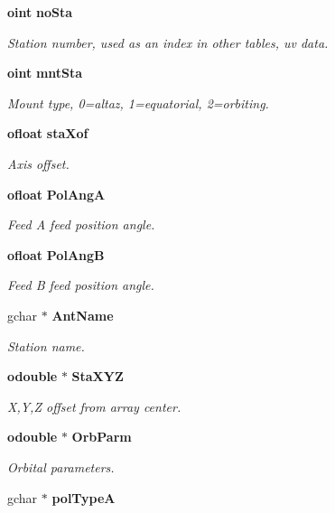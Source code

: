 \begin{CompactItemize}
{\bf oint} {\bf no\-Sta}
\begin{CompactList}\small\item\em Station number, used as an index in other tables, uv data. \item\end{CompactList}\item 
{\bf oint} {\bf mnt\-Sta}
\begin{CompactList}\small\item\em Mount type, 0=altaz, 1=equatorial, 2=orbiting. \item\end{CompactList}\item 
{\bf ofloat} {\bf sta\-Xof}
\begin{CompactList}\small\item\em Axis offset. \item\end{CompactList}\item 
{\bf ofloat} {\bf Pol\-Ang\-A}
\begin{CompactList}\small\item\em Feed A feed position angle. \item\end{CompactList}\item 
{\bf ofloat} {\bf Pol\-Ang\-B}
\begin{CompactList}\small\item\em Feed B feed position angle. \item\end{CompactList}\item 
gchar $\ast$ {\bf Ant\-Name}
\begin{CompactList}\small\item\em Station name. \item\end{CompactList}\item 
{\bf odouble} $\ast$ {\bf Sta\-XYZ}
\begin{CompactList}\small\item\em X,Y,Z offset from array center. \item\end{CompactList}\item 
{\bf odouble} $\ast$ {\bf Orb\-Parm}
\begin{CompactList}\small\item\em Orbital parameters. \item\end{CompactList}\item 
gchar $\ast$ {\bf pol\-Type\-A}

\end{CompactItemize}
